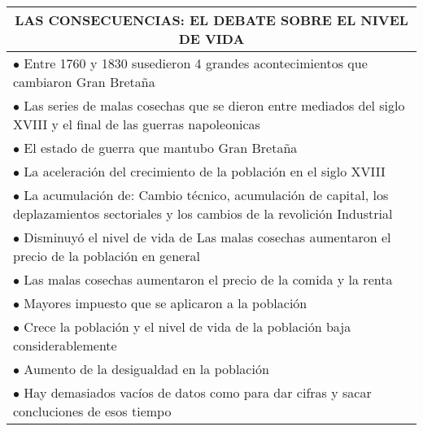\begingroup
\setlength{\tabcolsep}{12pt} %
\renewcommand{\arraystretch}{1.5} %
\begin{tabular}{p{15cm}}
  \multicolumn{1}{c}{\large LAS CONSECUENCIAS: EL DEBATE SOBRE EL NIVEL DE VIDA}                                                                             \\ \hline
  $\bullet$ Entre 1760 y 1830 susedieron 4 grandes acontecimientos que cambiaron Gran Bretaña                                                                \\
  \hspace{1cm} $\bullet$ Las series de malas cosechas que se dieron entre mediados del siglo XVIII y el final de las guerras napoleonicas                    \\
  \hspace{1cm} $\bullet$ El estado de guerra que mantubo Gran Bretaña                                                                                        \\
  \hspace{1cm} $\bullet$ La aceleración del crecimiento de la población en el siglo XVIII                                                                    \\
  \hspace{1cm} $\bullet$ La acumulación de: Cambio técnico, acumulación de capital, los deplazamientos sectoriales y los cambios de la revolición Industrial \\
  $\bullet$ Disminuyó el nivel de vida de Las malas cosechas aumentaron el precio de la población en general                                                 \\
  $\bullet$ Las malas cosechas aumentaron el precio de la comida y la renta                                                                                  \\
  $\bullet$ Mayores impuesto que se aplicaron a la población                                                                                                 \\
  $\bullet$ Crece la población y el nivel de vida de la población baja considerablemente                                                                    \\
  $\bullet$ Aumento de la desigualdad en la población                                                                                                        \\
  $\bullet$ Hay demasiados vacíos de datos como para dar cifras y sacar concluciones de esos tiempo                                                          \\

\end{tabular}
